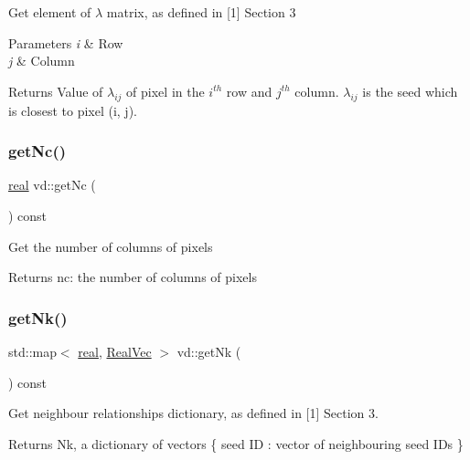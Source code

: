 Get element of $\lambda$ matrix, as defined in \mbox{[}1\mbox{]} Section 3 
\begin{DoxyParams}{Parameters}
{\em i} & Row \\
\hline
{\em j} & Column \\
\hline
\end{DoxyParams}
\begin{DoxyReturn}{Returns}
Value of $\lambda_{ij}$ of pixel in the $ i^{th} $ row and $ j^{th} $ column. $\lambda_{ij}$ is the seed which is closest to pixel (i, j). 
\end{DoxyReturn}
\mbox{\label{classvd_ab0de0a5b8929ed7a7bb6ca902a462dd4}} 
\subsubsection{\texorpdfstring{get\+Nc()}{getNc()}}
{\footnotesize\ttfamily \mbox{\hyperlink{typedefs_8cpp_a58a0c7cf2501f4492da833421be92547}{real}} vd\+::get\+Nc (\begin{DoxyParamCaption}{ }\end{DoxyParamCaption}) const}

Get the number of columns of pixels \begin{DoxyReturn}{Returns}
nc\+: the number of columns of pixels 
\end{DoxyReturn}
\mbox{\label{classvd_a90613fc46f246a5450e26487caff33f9}} 
\subsubsection{\texorpdfstring{get\+Nk()}{getNk()}}
{\footnotesize\ttfamily std\+::map$<$ \mbox{\hyperlink{typedefs_8cpp_a58a0c7cf2501f4492da833421be92547}{real}}, \mbox{\hyperlink{typedefs_8cpp_a84b6d9a0fbb45e01ad4a3aa5667f2992}{Real\+Vec}} $>$ vd\+::get\+Nk (\begin{DoxyParamCaption}{ }\end{DoxyParamCaption}) const}

Get neighbour relationships dictionary, as defined in \mbox{[}1\mbox{]} Section 3. \begin{DoxyReturn}{Returns}
Nk, a dictionary of vectors \{ seed ID \+: vector of neighbouring seed I\+Ds \} 
\end{DoxyReturn}
\mbox{\label{classvd_a4d058d2d1d675a741a83776c95b2acfb}} 
